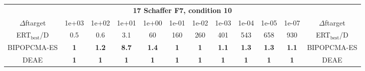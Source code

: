 \begin{tabular}{cccccccccccc}
 & \multicolumn{10}{c}{{\normalsize \textbf{17 Schaffer F7, condition 10}}}\\
$\Delta$ftarget& 1e+03& 1e+02& 1e+01& 1e+00& 1e-01& 1e-02& 1e-03& 1e-04& 1e-05& 1e-07 & $\Delta$ftarget \\
ERT$_{\textrm{best}}$/D& 0.5& 0.6& 3.1& 60& 160& 260& 401& 543& 658& 930 & ERT$_{\textrm{best}}$/D \\
\hline
BIPOPCMA-ES & \textbf{1} & \textbf{1.2} & \textbf{8.7} & \textbf{1.4} & \textbf{1} & \textbf{1} & \textbf{1.1} & \textbf{1.3} & \textbf{1.3} & \textbf{1.1} & BIPOPCMA-ES \cite{add_an_entry_for_BIPOPCMA-ES_in_bbob.bib}\\
DEAE & \textbf{1} & \textbf{1} & \textbf{1} & \textbf{1} & \textbf{1} & \textbf{1} & \textbf{1} & \textbf{1} & \textbf{1} & \textbf{1} & DEAE \cite{add_an_entry_for_DEAE_in_bbob.bib}
\end{tabular}
